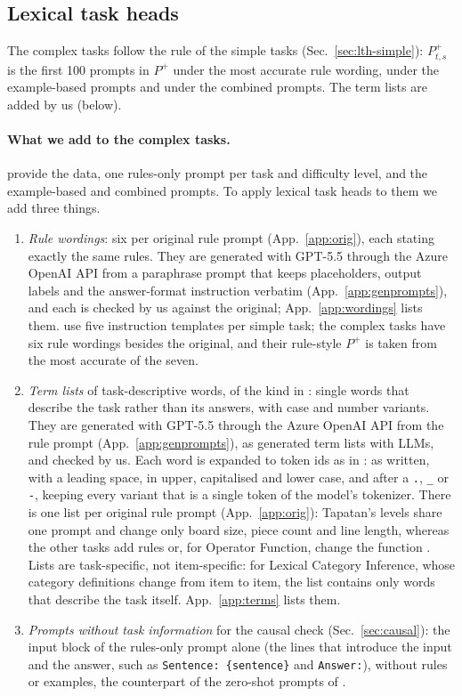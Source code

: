 \documentclass[11pt,a4paper]{article}
\begin{document}
\subsection{Lexical task heads}\label{sec:lth-complex}
The complex tasks follow the rule of the simple tasks (Sec.~\ref{sec:lth-simple}): $P^{+}_{t,s}$ is the first 100 prompts in $P^{+}$ under the most accurate rule wording, under the example-based prompts and under the combined prompts. The term lists are added by us (below).

\paragraph{What we add to the complex tasks.}\label{sec:adapt} \citet{fu2026rules} provide the data, one rules-only prompt per task and difficulty level, and the example-based and combined prompts. To apply lexical task heads to them we add three things.
\begin{enumerate}
\item \emph{Rule wordings}: six per original rule prompt (App.~\ref{app:orig}), each stating exactly the same rules. They are generated with GPT-5.5 through the Azure OpenAI API from a paraphrase prompt that keeps placeholders, output labels and the answer-format instruction verbatim (App.~\ref{app:genprompts}), and each is checked by us against the original; App.~\ref{app:wordings} lists them. \citet{yang2026shared} use five instruction templates per simple task; the complex tasks have six rule wordings besides the original, and their rule-style $P^{+}$ is taken from the most accurate of the seven.
\item \emph{Term lists} of task-descriptive words, of the kind in \citet[App.~A.2.1]{yang2026shared}: single words that describe the task rather than its answers, with case and number variants. They are generated with GPT-5.5 through the Azure OpenAI API from the rule prompt (App.~\ref{app:genprompts}), as \citet[App.~O]{yang2026shared} generated term lists with LLMs, and checked by us. Each word is expanded to token ids as in \citet{yang2026shared}: as written, with a leading space, in upper, capitalised and lower case, and after a \texttt{.}, \texttt{\_} or \texttt{-}, keeping every variant that is a single token of the model's tokenizer. There is one list per original rule prompt (App.~\ref{app:orig}): Tapatan's levels share one prompt and change only board size, piece count and line length, whereas the other tasks add rules or, for Operator Function, change the function \citep[Table~1, App.~F]{fu2026rules}. Lists are task-specific, not item-specific: for Lexical Category Inference, whose category definitions change from item to item, the list contains only words that describe the task itself. App.~\ref{app:terms} lists them.
\item \emph{Prompts without task information} for the causal check (Sec.~\ref{sec:causal}): the input block of the rules-only prompt alone (the lines that introduce the input and the answer, such as \texttt{Sentence: \{sentence\}} and \texttt{Answer:}), without rules or examples, the counterpart of the zero-shot prompts of \citet[Sec.~2.3.2]{yang2026shared}.
\end{enumerate}
\end{document}
